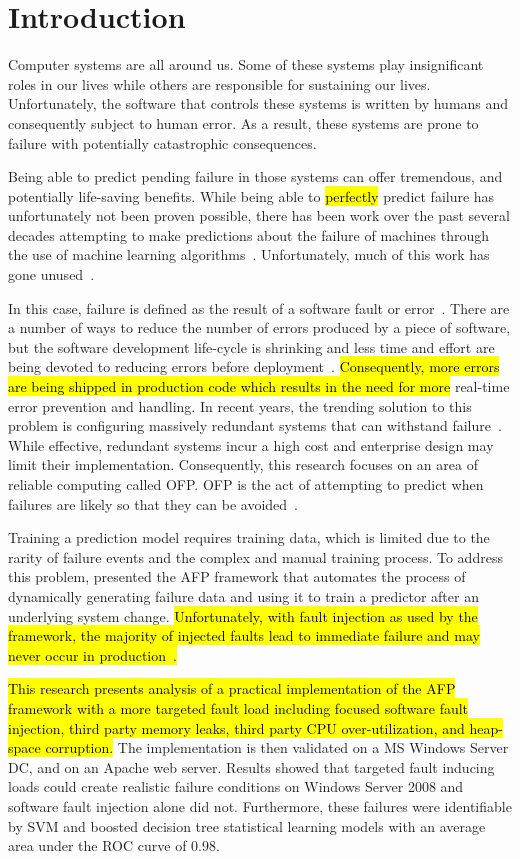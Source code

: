 \section{Introduction} \label{chapter1}
Computer systems are all around us.  Some of these systems play insignificant
roles in our lives while others are responsible for sustaining our lives.
Unfortunately, the software that controls these systems is written by humans
and consequently subject to human error.  As a result, these systems are prone
to failure with potentially catastrophic consequences.  

Being able to predict pending failure in those systems can offer tremendous,
and potentially life-saving benefits.  While being able to \hl{perfectly}
predict failure has unfortunately not been proven possible, there has been work
over the past several decades attempting to make predictions about the failure
of machines through the use of machine learning
algorithms~\citep{salfnerSurvey}.  Unfortunately, much of this work has gone
unused~\citep{irrera2015}.  

In this case, failure is defined as the result of a software fault or
error~\citep{salfnerSurvey}.  There are a number of ways to reduce the number
of errors produced by a piece of software, but the software development
life-cycle is shrinking and less time and effort are being devoted to reducing
errors before deployment~\citep{schmidt2016}.  \hl{Consequently, more errors
are being shipped in production code which results in the need for more}
real-time error prevention and handling.  In recent years, the trending
solution to this problem is configuring massively redundant systems that can
withstand failure~\citep{bauer2012}.  While effective, redundant systems incur
a high cost and enterprise design may limit their implementation.
Consequently, this research focuses on an area of reliable computing called
\ac{OFP}.  \ac{OFP} is the act of attempting to predict when failures are
likely so that they can be avoided~\citep{salfnerSurvey}.  

Training a prediction model requires training data, which is limited due to the
rarity of failure events and the complex and manual training process.  To
address this problem, \citet{irrera2015} presented the \ac{AFP} framework that
automates the process of dynamically generating failure data and using it to
train a predictor after an underlying system change.  \hl{Unfortunately, with
fault injection as used by the framework, the majority of injected faults lead
to immediate failure and may never occur in production~\citep{kikuchi2014}.}

\hl{This research presents analysis of a practical implementation of the
\ac{AFP} framework with a more targeted fault load including focused software
fault injection, third party memory leaks, third party \ac{CPU}
over-utilization, and heap-space corruption.} The implementation is then
validated on a \ac{MS} Windows Server \ac{DC}, and on an Apache web server.
Results showed that targeted fault inducing loads could create realistic
failure conditions on Windows Server 2008 and software fault injection alone
did not.  Furthermore, these failures were identifiable by \ac{SVM} and boosted
decision tree statistical learning models with an average area under the
\ac{ROC} curve of $0.98$.
